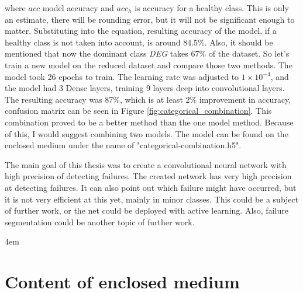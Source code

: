 \documentclass[thesis=B,english]{FITthesis}[2019/12/23]
\begin{document}
where $acc$ model accuracy and $acc_h$ is accuracy for a healthy class. This is only an estimate, there will be rounding error, but it will not be significant enough to matter. Substituting into the equation, resulting accuracy of the model, if a healthy class is not taken into account, is around 84.5\%. Also, it should be mentioned that now the dominant class \emph{DEG} takes 67\% of the dataset. So let's train a new model on the reduced dataset and compare those two methods. The model took 26 epochs to train. The learning rate was adjusted to $1 \times 10^{-4}$, and the model had 3 Dense layers, training 9 layers deep into convolutional layers. The resulting accuracy was 87\%, which is at least 2\% improvement in accuracy, confusion matrix can be seen in Figure \ref{fig:categorical_combination}. This combination proved to be a better method than the one model method. Because of this, I would suggest combining two models. The model can be found on the enclosed medium under the name of "categorical-combination.h5".

\begin{conclusion}
    The main goal of this thesis was to create a convolutional neural network with high precision of detecting failures. The created network has very high precision at detecting failures. It can also point out which failure might have occurred, but it is not very efficient at this yet, mainly in minor classes. This could be a subject of further work, or the net could be deployed with active learning. Also, failure segmentation could be another topic of further work.
\end{conclusion}

% 
% 

\emergencystretch 4em
\printbibliography
\fussy

\appendix

\printnoidxglossary[type=\acronymtype,numberedsection=autolabel] %

\chapter{Content of enclosed medium}\label{app:CD_content}


\begin{figure}
\end{figure}
\end{document}
